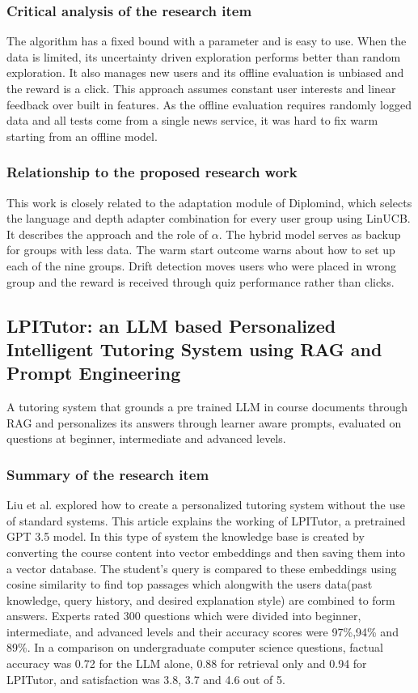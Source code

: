 \documentclass{FastFyp}
\begin{document}
\subsubsection{Critical analysis of the research item}
The algorithm has a fixed bound with a parameter and is easy to use. When the data is limited, its uncertainty driven exploration performs better than random exploration. It also manages new users and its offline evaluation is unbiased and the reward is a click. This approach assumes constant user interests and linear feedback over built in features. As the offline evaluation requires randomly logged data and all tests come from a single news service, it was hard to fix warm starting from an offline model.

\subsubsection{Relationship to the proposed research work}
This work is closely related to the adaptation module of Diplomind, which selects the language and depth adapter combination for every user group using LinUCB. It describes the approach and the role of $\alpha$. The hybrid model serves as backup for groups with less data. The warm start outcome warns about how to set up each of the nine groups. Drift detection moves users who were placed in wrong group and the reward is received through quiz performance rather than clicks.



\subsection{LPITutor: an LLM based Personalized Intelligent Tutoring System using RAG and Prompt Engineering}
A tutoring system that grounds a pre trained LLM in course documents through RAG and personalizes its answers through learner aware prompts, evaluated on questions at beginner, intermediate and advanced levels.


\subsubsection{Summary of the research item}
Liu et al. \cite{liu2025lpitutor} explored how to create a personalized tutoring system without the use of standard systems. This article explains the working of LPITutor, a pretrained GPT 3.5 model. In this type of system the knowledge base is created by converting the course content into vector embeddings and then saving them into a vector database. The student's query is compared to these embeddings using cosine similarity to find top passages which alongwith the users data(past knowledge, query history, and desired explanation style) are combined to form answers. Experts rated 300 questions which were divided into beginner, intermediate, and advanced levels and their accuracy scores were 97\%,94\% and 89\%. In a comparison on undergraduate computer science questions, factual accuracy was 0.72 for the LLM alone, 0.88 for retrieval only and 0.94 for LPITutor, and satisfaction was 3.8, 3.7 and 4.6 out of 5. 
\end{document}
